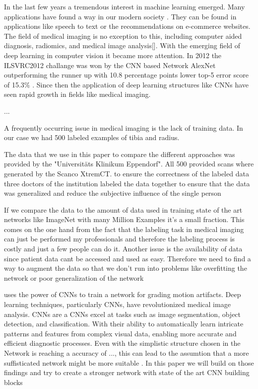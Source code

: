 \documentclass[
a4paper, 
12pt,
grayscalebody, %
abstract=on,
twoside, BCOR10mm, 12pt, DIV13,headinclude, footexclude, final, abstracton, openright
]{ibireprt}
\numberwithin{equation}{chapter}
\numberwithin{table}{chapter}
\numberwithin{figure}{chapter}
\numberwithin{algorithm}{chapter}
\numberwithin{example}{chapter}
\numberwithin{example}{chapter}
\begin{document}
In the last few years a tremendous interest in machine learning emerged. Many applications have found a way in our modern society \cite{LeCun2015}. They can be found in applications like speech to text or the recommendations on e-commerce websites. The field of medical imaging is no exception to this, including computer aided diagnosis, radiomics, and medical image analysis[]. With the emerging field of deep learning in computer vision it became more attention. In 2012 the ILSVRC2012 challange  was won by the CNN based Network AlexNet outperforming the runner up with 10.8 percentage points lower top-5 error score of 15.3\% . Since then the application of deep learning structures like CNNs have seen rapid growth in fields like medical imaging. 

 ...\cite{Yamashita2018} %

A frequently occurring issue in medical imaging is the lack of training data. In our case we had 500 labeled examples of tibia and radius.

The data that we use in this paper to compare the different approaches was provided by the "Universitäts Klinikum Eppendorf". All 500 provided scans where generated by the Scanco XtremCT.%
to ensure the correctness of the labeled data three doctors of the institution labeled the data together to ensure that the data was generalized and reduce the subjective influence of the single person  

 If we compare the data to the amount of data used in training state of the art networks like ImageNet with many Million Examples it's a small fraction. This comes on the one hand from the fact that the labeling task in medical imaging can just be performed my professionals and therefore the labeling process is costly and just a few people can do it. Another issue is the availability of data since patient data cant be accessed and used as easy. Therefore we need to find a way to augment the data so that we don't run into problems like overfitting the network or poor generalization of the network 
  

\cite{Sode2011} uses the power of CNNs to train a network for grading motion artifacts. Deep learning techniques, particularly CNNs, have revolutionized medical image analysis. CNNs are a %
CNNs excel at tasks such as image segmentation, object detection, and classification. With their ability to automatically learn intricate patterns and features from complex visual data, enabling more accurate and efficient diagnostic processes. %
Even with the simplistic structure chosen in \cite{Sode2011} the Network is reaching a accuracy of ..., this can lead to the assumtion that a more suffisticated network might be more suitable . In this paper we will build on those findings and try to create a stronger network with state of the art CNN building blocks 
\end{document}

